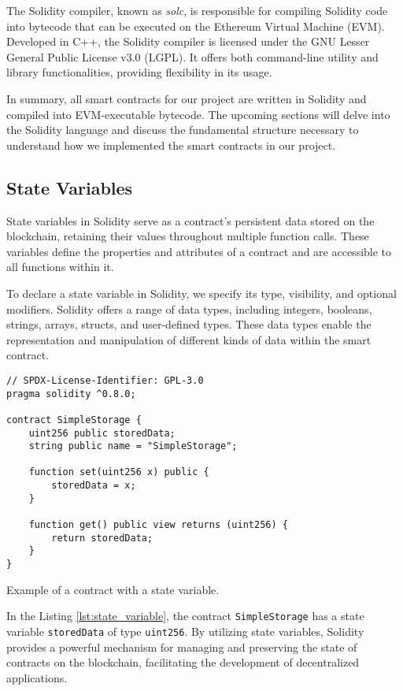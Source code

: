 The Solidity compiler, known as \textit{solc}, is responsible for compiling Solidity code into bytecode that can be executed on the Ethereum Virtual Machine (EVM). 
Developed in C++, the Solidity compiler is licensed under the GNU Lesser General Public License v3.0 (LGPL). It offers both command-line utility and library 
functionalities, providing flexibility in its usage.

In summary, all smart contracts for our project are written in Solidity and compiled into EVM-executable bytecode. The upcoming sections will delve into the Solidity 
language and discuss the fundamental structure necessary to understand how we implemented the smart contracts in our project.



\subsection{State Variables}

State variables in Solidity serve as a contract's persistent data stored on the blockchain, retaining their values throughout multiple function calls. These 
variables define the properties and attributes of a contract and are accessible to all functions within it.

To declare a state variable in Solidity, we specify its type, visibility, and optional modifiers. Solidity offers a range of data types, including integers, booleans, 
strings, arrays, structs, and user-defined types. These data types enable the representation and manipulation of different kinds of data within the smart contract.

\begin{listing}[!ht]
    \begin{verbatim}
// SPDX-License-Identifier: GPL-3.0
pragma solidity ^0.8.0;

contract SimpleStorage {
    uint256 public storedData;
    string public name = "SimpleStorage";

    function set(uint256 x) public {
        storedData = x;
    }

    function get() public view returns (uint256) {
        return storedData;
    }
}
    \end{verbatim}
    \caption{Example of a contract with a state variable.}
    \label{lst:state_variable}
\end{listing}

In the Listing \ref{lst:state_variable}, the contract \texttt{SimpleStorage} has a state variable \texttt{storedData} of type \texttt{uint256}.
By utilizing state variables, Solidity provides a powerful mechanism for managing and preserving the state of contracts on the blockchain, facilitating the development of decentralized applications.

